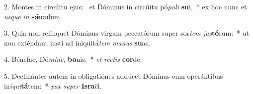 2. Montes in circúitu ejus: \dag\  et Dóminus in circúitu pó\textit{pu}\textit{li} \textbf{su}i,~*  ex hoc nunc et \textit{us}\textit{que} \textit{in} \textbf{sǽ}\textbf{cu}lum.\

3. Quia non relínquet Dóminus virgam peccatórum super sor\textit{tem} \textit{jus}\textbf{tó}rum:~*  ut non exténdant justi ad iniquitá\textit{tem} \textit{ma}\textit{nus} \textbf{su}as.\

4. Bénefac, Dó\textit{mi}\textit{ne}, \textbf{bo}nis,~*  \textit{et} \textit{rec}\textit{tis} \textbf{cor}de.\

5. Declinántes autem in obligatiónes addúcet Dóminus cum operántibus in\textit{i}\textit{qui}\textbf{tá}tem:~*  \textit{pax} \textit{su}\textit{per} \textbf{Is}\textbf{ra}ël.\

